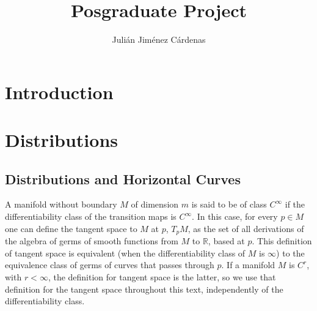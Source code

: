 \documentclass[12pt, letterpaper, reqno]{amsart}
\author{Julián Jiménez Cárdenas}
\title[Posgraduate Project]{Posgraduate Project}
\theoremstyle{definition}
\theoremstyle{plain}
\theoremstyle{remark}
\begin{document}
\maketitle
\begin{abstract}
\end{abstract}

\section*{Introduction}
\label{sec:0}


\section{Distributions}
\label{sec:1}

\subsection{Distributions and Horizontal Curves}%
\label{sub:distributions}


A manifold without boundary $M$ of dimension $ m $  is said to be of class $ C^\infty $ if the differentiability class of the transition maps is $C^\infty.$ In this case, for every $ p\in M $ one can define the tangent space to $ M $ at $ p $, $ T_p M $, as the set of all derivations of the algebra of germs of smooth functions from $ M $ to $ \mathbb{R}  $,  based at $ p $. This definition of tangent space is equivalent (when the differentiability class of $ M $ is $ \infty $) to the equivalence class of germs of curves that passes through $ p $. If a manifold $ M $  is $C^r$, with $r< \infty$, the definition for tangent space is the latter, so we use that definition for the tangent space throughout this text, independently of the differentiability class.
\end{document}
